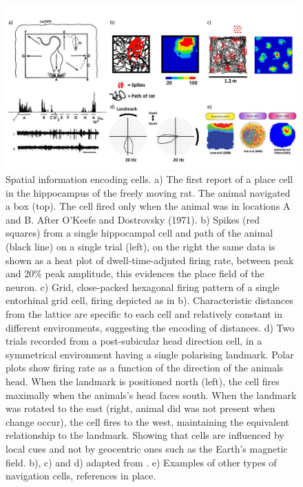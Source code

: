 \begin{figure}
    \centering
    \includegraphics[width=\textwidth]{Figures/Chapter1/intro_fig_spatnav_cells.pdf}
    \caption{Spatial information encoding cells. a) The first report of a place cell in the hippocampus of the freely moving rat. The animal navigated a box (top). The cell fired only when the animal was in locations A and B. After O’Keefe and Dostrovsky (1971). b) Spikes (red squares) from a single hippocampal cell and path of the animal (black line) on a single trial (left), on the right the same data is shown as a heat plot of dwell-time-adjuted firing rate, between peak and 20\% peak amplitude, this evidences the place field of the neuron. c) Grid, close-packed hexagonal firing pattern of a single entorhinal grid cell, firing depicted as in b). Characteristic distances from the lattice are specific to each cell and relatively constant in different environments, suggesting the encoding of distances. d) Two trials recorded from a post-subicular head direction cell, in a symmetrical environment having a single polarising landmark. Polar plots show firing rate as a function of the direction of the animals head. When the landmark is positioned north (left), the cell fires maximally when the animals’s head faces south. When the landmark was rotated to the east (right, animal did was not present when change occur), the cell fires to the west, maintaining the equivalent relationship to the landmark. Showing that cells are influenced by local cues and not by geocentric ones such as the Earth’s magnetic field. b), c) and d) adapted from \cite{grieves2017}. e) Examples of other types of navigation cells, references in place.}
    \label{fig:chap1:spatialnavigationcells}
\end{figure}
